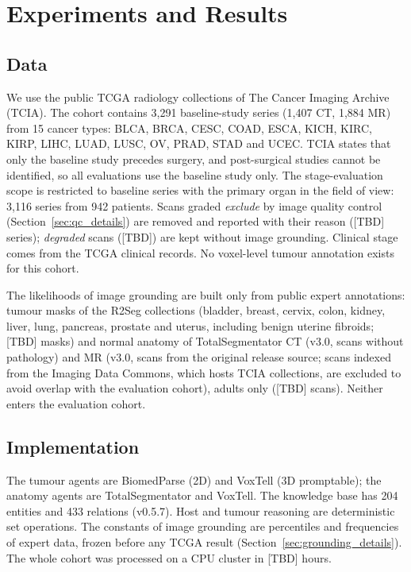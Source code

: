 \documentclass[fleqn,10pt]{olplainarticle}
\begin{document}
\section{Experiments and Results}
\label{sec:results}

\subsection{Data}
We use the public TCGA radiology collections of The Cancer Imaging Archive (TCIA). The cohort contains 3{,}291
baseline-study series (1{,}407 CT, 1{,}884 MR) from 15 cancer types: BLCA, BRCA, CESC, COAD, ESCA, KICH, KIRC, KIRP,
LIHC, LUAD, LUSC, OV, PRAD, STAD and UCEC. TCIA states that only the baseline study precedes surgery, and post-surgical
studies cannot be identified, so all evaluations use the baseline study only. The stage-evaluation scope is restricted
to baseline series with the primary organ in the field of view: 3{,}116 series from 942 patients. Scans graded \emph{exclude} by image quality control (Section~\ref{sec:qc_details}) are removed and reported with their reason ([TBD] series); \emph{degraded} scans ([TBD]) are kept without image grounding. Clinical stage comes
from the TCGA clinical records. No voxel-level tumour annotation exists for this cohort.

The likelihoods of image grounding are built only from public expert annotations: tumour masks of the R2Seg collections
(bladder, breast, cervix, colon, kidney, liver, lung, pancreas, prostate and uterus, including benign uterine fibroids;
[TBD] masks) and normal anatomy of
TotalSegmentator CT (v3.0, scans without pathology) and MR (v3.0, scans from the original release source; scans indexed from the
Imaging Data Commons, which hosts TCIA collections, are excluded to avoid overlap with the evaluation cohort), adults only ([TBD] scans). Neither enters the evaluation cohort.

\subsection{Implementation}
The tumour agents are BiomedParse (2D) and VoxTell (3D promptable); the anatomy agents are TotalSegmentator and VoxTell. The
knowledge base has 204 entities and 433 relations (v0.5.7). Host and tumour reasoning are deterministic set operations.
The constants of image grounding are percentiles and frequencies of expert data, frozen before any TCGA result
(Section~\ref{sec:grounding_details}). The whole cohort was processed on a CPU cluster in [TBD] hours.
\end{document}
